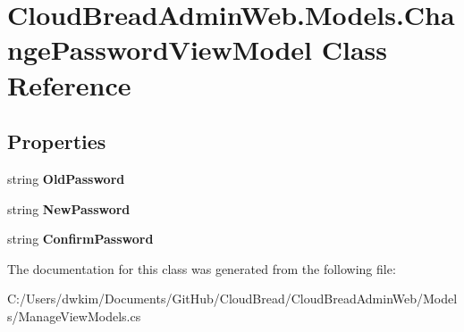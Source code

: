 \hypertarget{class_cloud_bread_admin_web_1_1_models_1_1_change_password_view_model}{}\section{Cloud\+Bread\+Admin\+Web.\+Models.\+Change\+Password\+View\+Model Class Reference}
\label{class_cloud_bread_admin_web_1_1_models_1_1_change_password_view_model}
\subsection*{Properties}
\begin{DoxyCompactItemize}
\item 
string {\bfseries Old\+Password}\hypertarget{class_cloud_bread_admin_web_1_1_models_1_1_change_password_view_model_ad13c5856dd47f45c11abf687622dd72b}{}\label{class_cloud_bread_admin_web_1_1_models_1_1_change_password_view_model_ad13c5856dd47f45c11abf687622dd72b}

\item 
string {\bfseries New\+Password}\hypertarget{class_cloud_bread_admin_web_1_1_models_1_1_change_password_view_model_a57f7addf7cf3000d14eba846774ae494}{}\label{class_cloud_bread_admin_web_1_1_models_1_1_change_password_view_model_a57f7addf7cf3000d14eba846774ae494}

\item 
string {\bfseries Confirm\+Password}\hypertarget{class_cloud_bread_admin_web_1_1_models_1_1_change_password_view_model_ab3ce99d097dc66a28bb1757726a9e7f3}{}\label{class_cloud_bread_admin_web_1_1_models_1_1_change_password_view_model_ab3ce99d097dc66a28bb1757726a9e7f3}

\end{DoxyCompactItemize}


The documentation for this class was generated from the following file\+:\begin{DoxyCompactItemize}
\item 
C\+:/\+Users/dwkim/\+Documents/\+Git\+Hub/\+Cloud\+Bread/\+Cloud\+Bread\+Admin\+Web/\+Models/Manage\+View\+Models.\+cs\end{DoxyCompactItemize}
